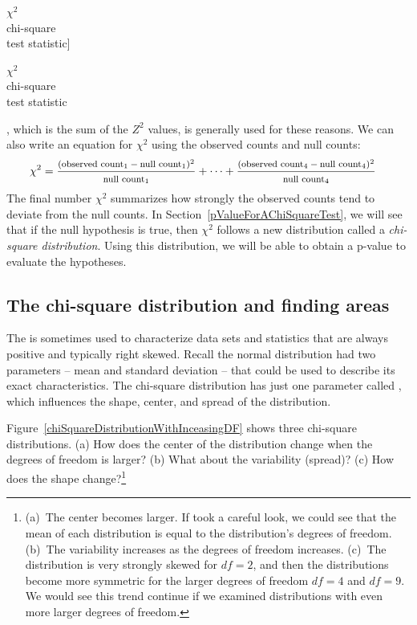$\chi^2$\vspace{0.5mm}\\\footnotesize chi-square\\test statistic]{\raggedright\vspace{9mm}

$\chi^2$\vspace{0.5mm}\\\footnotesize chi-square\\test statistic}, which is the sum of the $Z^2$ values, is generally used for these reasons. We can also write an equation for $\chi^2$ using the observed counts and null counts:
{\begin{align*}
\chi^2 &=
	\frac
	{\text{\footnotesize$(\text{observed count}_1 - \text{null count}_1)^2$}}
	{\text{\footnotesize$\text{null count}_1$}}
	+ \dots + \frac
	{\text{\footnotesize$(\text{observed count}_4 - \text{null count}_4)^2$}}
	{\text{\footnotesize$\text{null count}_4$}}
\end{align*}
}The final number $\chi^2$ summarizes how strongly the observed counts tend to deviate from the null counts. In Section~\ref{pValueForAChiSquareTest}, we will see that if the null hypothesis is true, then $\chi^2$ follows a new distribution called a \emph{chi-square distribution}. Using this distribution, we will be able to obtain a p-value to evaluate the hypotheses.


\subsection{The chi-square distribution and finding areas}

The  is sometimes used to characterize data sets and statistics that are always positive and typically right skewed. Recall the normal distribution had two parameters -- mean and standard deviation -- that could be used to describe its exact characteristics. The chi-square distribution has just one parameter called , which influences the shape, center, and spread of the distribution.

\begin{exercise}\label{exerChiSquareDistributionDescriptionWithMoreDOF}
Figure~\ref{chiSquareDistributionWithInceasingDF} shows three chi-square distributions. (a) How does the center of the distribution change when the degrees of freedom is larger? (b) What about the variability (spread)? (c) How does the shape change?\footnote{(a)~The center becomes larger. If took a careful look, we could see that the mean of each distribution is equal to the distribution's degrees of freedom. (b)~The variability increases as the degrees of freedom increases. (c)~The distribution is very strongly skewed for $df=2$, and then the distributions become more symmetric for the larger degrees of freedom $df=4$ and $df=9$. We would see this trend continue if we examined distributions with even more larger degrees of freedom.}
\end{exercise}

